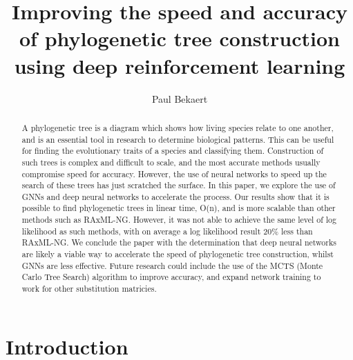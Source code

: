 \documentclass{mpaper}
\begin{document}
\title{Improving the speed and accuracy of phylogenetic tree construction using deep reinforcement learning}
\author{Paul Bekaert}

\maketitle

\begin{abstract}    
A phylogenetic tree is a diagram which shows how living species relate to one another, and is an essential tool in research to determine biological patterns. This can be useful for finding the evolutionary traits of a species and classifying them. Construction of such trees is complex and difficult to scale, and the most accurate methods usually compromise speed for accuracy. However, the use of neural networks to speed up the search of these trees has just scratched the surface. In this paper, we explore the use of GNNs and deep neural networks to accelerate the process. Our results show that it is possible to find phylogenetic trees in linear time, O(n), and is more scalable than other methods such as RAxML-NG. However, it was not able to achieve the same level of log likelihood as such methods, with on average a log likelihood result 20\% less than RAxML-NG. We conclude the paper with the determination that deep neural networks are likely a viable way to accelerate the speed of phylogenetic tree construction, whilst GNNs are less effective. Future research could include the use of the MCTS (Monte Carlo Tree Search) algorithm to improve accuracy, and expand network training to work for other substitution matricies.
\end{abstract}


\section{Introduction}
\end{document}
